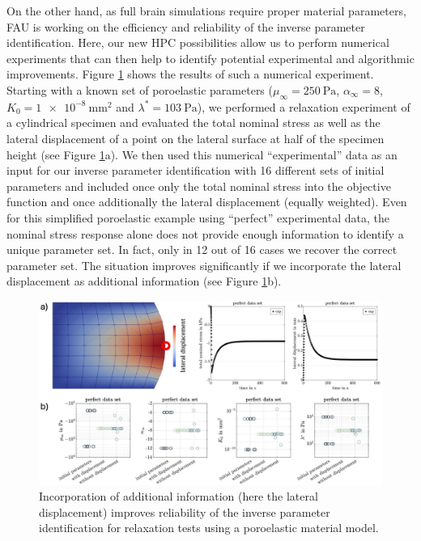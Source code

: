 \documentclass[a4paper,12pt]{article}
\begin{document}
On the other hand, as full brain simulations require proper material parameters, FAU is working on the efficiency and reliability of the inverse parameter identification. Here, our new HPC possibilities allow us to perform numerical experiments that can then help to identify potential experimental and algorithmic improvements. Figure \ref{fig:fau-inverse-param-identification} shows the results of such a numerical experiment. Starting with a known set of poroelastic parameters ($\mu_\infty = \SI{250}{\pascal}$, $\alpha_\infty = \num{8}$, $K_0 = \SI{1e-8}{\milli\meter\squared}$ and $\lambda^* = \SI{103}{\pascal}$), we performed a relaxation experiment of a cylindrical specimen and evaluated the total nominal stress as well as the lateral displacement of a point on the lateral surface at half of the specimen height (see Figure \ref{fig:fau-inverse-param-identification}a). We then used this numerical ``experimental'' data as an input for our inverse parameter identification with 16 different sets of initial parameters and included once only the total nominal stress into the objective function and once additionally the lateral displacement (equally weighted). Even for this simplified poroelastic example using ``perfect'' experimental data, the nominal stress response alone does not provide enough information to identify a unique parameter set. In fact, only in 12 out of 16 cases we recover the correct parameter set. The situation improves significantly if we incorporate the lateral displacement as additional information (see Figure \ref{fig:fau-inverse-param-identification}b).

\begin{figure}
  \centering

  \includegraphics[width=\textwidth]{fau-inverse-param-identification.jpg}

  \caption{Incorporation of additional information (here the lateral displacement) improves reliability of the inverse parameter identification for relaxation tests using a poroelastic material model.}
  \label{fig:fau-inverse-param-identification}
\end{figure}
\end{document}
